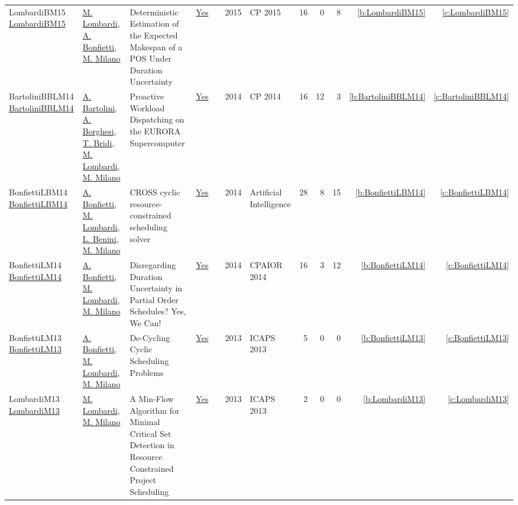 {\begin{longtable}{>{\raggedright\arraybackslash}p{3cm}>{\raggedright\arraybackslash}p{6cm}>{\raggedright\arraybackslash}p{6.5cm}rrrp{2.5cm}rrrrr}
LombardiBM15 \href{https://doi.org/10.1007/978-3-319-23219-5\_20}{LombardiBM15} & \hyperref[auth:a143]{M. Lombardi}, \hyperref[auth:a204]{A. Bonfietti}, \hyperref[auth:a144]{M. Milano} & Deterministic Estimation of the Expected Makespan of a {POS} Under Duration Uncertainty & \href{../works/LombardiBM15.pdf}{Yes} & \cite{LombardiBM15} & 2015 & CP 2015 & 16 & 0 & 8 & \ref{b:LombardiBM15} & \ref{c:LombardiBM15}\\
BartoliniBBLM14 \href{https://doi.org/10.1007/978-3-319-10428-7\_55}{BartoliniBBLM14} & \hyperref[auth:a231]{A. Bartolini}, \hyperref[auth:a232]{A. Borghesi}, \hyperref[auth:a233]{T. Bridi}, \hyperref[auth:a143]{M. Lombardi}, \hyperref[auth:a144]{M. Milano} & Proactive Workload Dispatching on the {EURORA} Supercomputer & \href{../works/BartoliniBBLM14.pdf}{Yes} & \cite{BartoliniBBLM14} & 2014 & CP 2014 & 16 & 12 & 3 & \ref{b:BartoliniBBLM14} & \ref{c:BartoliniBBLM14}\\
BonfiettiLBM14 \href{https://doi.org/10.1016/j.artint.2013.09.006}{BonfiettiLBM14} & \hyperref[auth:a204]{A. Bonfietti}, \hyperref[auth:a143]{M. Lombardi}, \hyperref[auth:a248]{L. Benini}, \hyperref[auth:a144]{M. Milano} & {CROSS} cyclic resource-constrained scheduling solver & \href{../works/BonfiettiLBM14.pdf}{Yes} & \cite{BonfiettiLBM14} & 2014 & Artificial Intelligence & 28 & 8 & 15 & \ref{b:BonfiettiLBM14} & \ref{c:BonfiettiLBM14}\\
BonfiettiLM14 \href{https://doi.org/10.1007/978-3-319-07046-9\_15}{BonfiettiLM14} & \hyperref[auth:a204]{A. Bonfietti}, \hyperref[auth:a143]{M. Lombardi}, \hyperref[auth:a144]{M. Milano} & Disregarding Duration Uncertainty in Partial Order Schedules? Yes, We Can! & \href{../works/BonfiettiLM14.pdf}{Yes} & \cite{BonfiettiLM14} & 2014 & CPAIOR 2014 & 16 & 3 & 12 & \ref{b:BonfiettiLM14} & \ref{c:BonfiettiLM14}\\
BonfiettiLM13 \href{http://www.aaai.org/ocs/index.php/ICAPS/ICAPS13/paper/view/6050}{BonfiettiLM13} & \hyperref[auth:a204]{A. Bonfietti}, \hyperref[auth:a143]{M. Lombardi}, \hyperref[auth:a144]{M. Milano} & De-Cycling Cyclic Scheduling Problems & \href{../works/BonfiettiLM13.pdf}{Yes} & \cite{BonfiettiLM13} & 2013 & ICAPS 2013 & 5 & 0 & 0 & \ref{b:BonfiettiLM13} & \ref{c:BonfiettiLM13}\\
LombardiM13 \href{http://www.aaai.org/ocs/index.php/ICAPS/ICAPS13/paper/view/6052}{LombardiM13} & \hyperref[auth:a143]{M. Lombardi}, \hyperref[auth:a144]{M. Milano} & A Min-Flow Algorithm for Minimal Critical Set Detection in Resource Constrained Project Scheduling & \href{../works/LombardiM13.pdf}{Yes} & \cite{LombardiM13} & 2013 & ICAPS 2013 & 2 & 0 & 0 & \ref{b:LombardiM13} & \ref{c:LombardiM13}\\

\end{longtable}}
